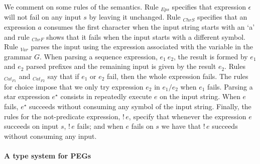 \documentclass[preprint,12pt]{elsarticle}
\theoremstyle{definition}
\begin{document}
We comment on some rules of the semantics. Rule $_{Eps}$ specifies that
expression $\epsilon$ will not fail on any input $s$ by leaving it unchanged.
Rule $_{ChrS}$ specifies that an expression $a$ consumes the first character when
the input string starts with an `a' and rule $_{ChrF}$ shows that it fails when
the input starts with a different symbol. Rule $_{Var}$ parses the input using
the expression associated with the variable in the grammar $G$. When parsing a
sequence expression, $e_1\:e_2$, the result is formed by $e_1$ and $e_2$ parsed
prefixes and the remaining input is given by the result $e_2$. Rules $_{Cat_{F1}}$ and
$_{Cat_{F2}}$ say that if $e_1$ or $e_2$ fail, then the whole expression fails.
The rules for choice impose that we only try
expression $e_2$ in $e_1 / e_2$ when $e_1$ fails. Parsing a star
expression $e^\star$ consists in repeatedly execute $e$ on the input string.
When $e$ fails, $e^\star$ succeeds without consuming any symbol of the input
string. Finally, the rules for the not-predicate expression, $!\,e$, specify
that whenever the expression $e$ succeeds on input $s$, $!\,e$ fails; and when $e$
fails on $s$ we have that $!\,e$ succeeds without consuming any input.

\paragraph{A type system for PEGs}
\end{document}
